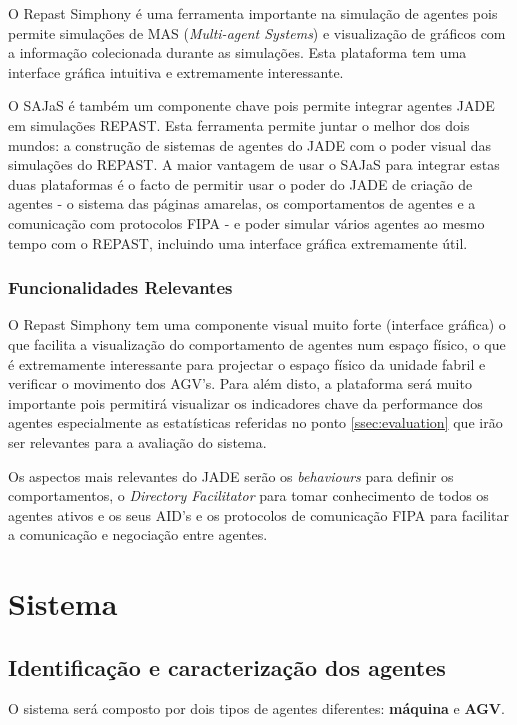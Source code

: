 \begin{titlepage}
O Repast Simphony é uma ferramenta importante na simulação de agentes pois permite simulações de MAS (\textit{Multi-agent Systems}) e visualização de gráficos com a informação colecionada durante as simulações. Esta plataforma tem uma interface gráfica intuitiva e extremamente interessante.

O SAJaS é também um componente chave pois permite integrar agentes JADE em simulações REPAST. Esta ferramenta permite juntar o melhor dos dois mundos: a construção de sistemas de agentes do JADE com o poder visual das simulações do REPAST. A maior vantagem de usar o SAJaS para integrar estas duas plataformas é o facto de permitir usar o poder do JADE de criação de agentes - o sistema das páginas amarelas, os comportamentos de agentes e a comunicação com protocolos FIPA - e poder simular vários agentes ao mesmo tempo com o REPAST, incluindo uma interface gráfica extremamente útil.

\subsubsection{Funcionalidades Relevantes}

O Repast Simphony tem uma componente visual muito forte (interface gráfica) o que facilita a visualização do comportamento de agentes num espaço físico, o que é extremamente interessante para projectar o espaço físico da unidade fabril e verificar o movimento dos AGV's. Para além disto, a plataforma será muito importante pois permitirá visualizar os indicadores chave da performance dos agentes especialmente as estatísticas referidas no ponto \ref{ssec:evaluation} que irão ser relevantes para a avaliação do sistema.

Os aspectos mais relevantes do JADE serão os \textit{behaviours} para definir os comportamentos, o \textit{Directory Facilitator} para tomar conhecimento de todos os agentes ativos e os seus AID's e os protocolos de comunicação FIPA para facilitar a comunicação e negociação entre agentes.



\section{Sistema}

\subsection{Identificação e caracterização dos agentes}
O sistema será composto por dois tipos de agentes diferentes: \textbf{máquina} e \textbf{AGV}.


\end{titlepage}
